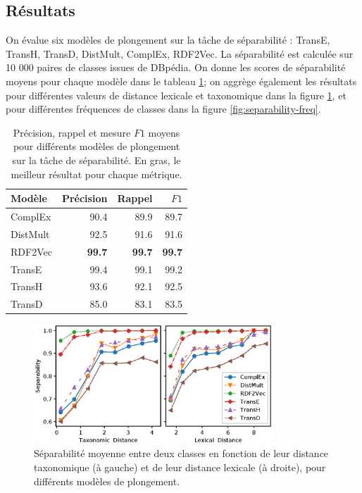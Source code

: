 \subsection{Résultats}

On évalue six modèles de plongement sur la tâche de séparabilité : TransE, TransH, TransD, DistMult, ComplEx, RDF2Vec. La séparabilité est calculée sur 10 000 paires de classes issues de DBpédia. On donne les scores de séparabilité moyens pour chaque modèle dans le tableau \ref{tab:separability-results}; on aggrège également les résultats pour différentes valeurs de distance lexicale et taxonomique dans la figure \ref{fig:separability-lexical}, et pour différentes fréquences de classes dans la figure \ref{fig:separability-freq}.


\begin{table}[]
    \centering
    \caption[Séparabilité moyenne de différents modèles de plongement]{Précision, rappel et mesure $F1$ moyens pour différents modèles de plongement sur la tâche de séparabilité. En gras, le meilleur résultat pour chaque métrique.}
    \begin{tabular}{|lrrr|}
    \hline 
        Modèle     & Précision  & Rappel & $F1$ \\
        \hline 
        ComplEx   &	90.4	&	89.9	&	89.7 \\
        DistMult  &	92.5	&	91.6	&	91.6 \\
        RDF2Vec   &	\textbf{99.7}	&	\textbf{99.7}	&	\textbf{99.7} \\
        TransE    &	99.4	&	99.1	&	99.2 \\
        TransH    &	93.6	&	92.1	&	92.5 \\
        TransD    &	85.0	&	83.1	&	83.5 \\
        \hline
    \end{tabular}
    \label{tab:separability-results}
\end{table}

\begin{figure}[h]
  \centering
  \includegraphics[width=0.8\textwidth]{fig/plot/sep1_dist.eps}
  \caption[Séparabilité moyenne en fonction de la distance entre classes]{Séparabilité moyenne entre deux classes en fonction de leur distance taxonomique (à gauche) et de leur distance lexicale (à droite), pour différents modèles de plongement. }
  \label{fig:separability-lexical}
\end{figure}

